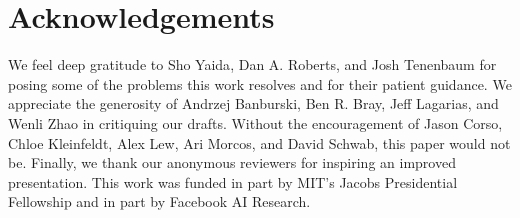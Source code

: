 \documentclass{article}
\theoremstyle{plain}
\theoremstyle{definition}
\begin{document}




            

\section*{Acknowledgements}

        We feel deep gratitude to
            \textsf{Sho Yaida},
            \textsf{Dan A. Roberts}, and
            \textsf{Josh Tenenbaum}
        for posing some of the problems this work resolves and for their
        patient guidance.  We appreciate the generosity of
            \textsf{Andrzej Banburski},
            \textsf{Ben R. Bray},
            \textsf{Jeff Lagarias}, and
            \textsf{Wenli Zhao}
        in critiquing our drafts.
        Without the encouragement of
            \textsf{Jason Corso},
            \textsf{Chloe Kleinfeldt},
            \textsf{Alex Lew}, 
            \textsf{Ari Morcos}, and
            \textsf{David Schwab},
        this paper would not be.
        Finally, we thank our anonymous reviewers for inspiring an improved
        presentation.
        This work was funded in part by MIT's Jacobs Presidential Fellowship
        and in part by Facebook AI Research.
        

    
    
            
\end{document}
